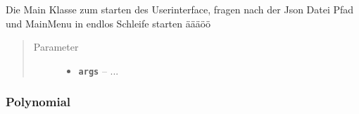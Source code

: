 \documentclass[letterpaper,10pt,ngerman]{sphinxmanual}
\begin{document}
\begin{fulllineitems}
\label{com/linuxluigi/polynomial/Main:com.linuxluigi.polynomial.Main.main(String__)}
Die Main Klasse zum starten des Userinterface, fragen nach der Json Datei Pfad und MainMenu in endlos Schleife starten äääöö
\begin{quote}\begin{description}
\item[{Parameter}] \leavevmode\begin{itemize}
\item {} 
\textbf{\texttt{args}} -- 
...


\end{itemize}

\end{description}\end{quote}

\end{fulllineitems}



\subsubsection{Polynomial}
\label{com/linuxluigi/polynomial/Polynomial:polynomial}\label{com/linuxluigi/polynomial/Polynomial::doc}
\end{document}
